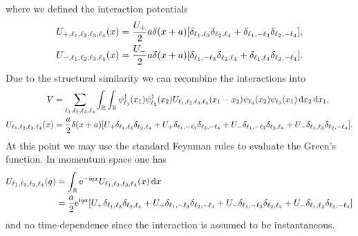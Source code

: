 \documentclass[english, parskip=full]{scrartcl}
\begin{document}
where we defined the interaction potentials
\begin{align}
U_{+,\ell_1,\ell_2,\ell_3,\ell_4}(x) &= \frac{U_+}{2} a\delta(x+a) \klb*{\delta_{\ell_1,\ell_3} \delta_{\ell_2,\ell_4} + \delta_{\ell_1,-\ell_3} \delta_{\ell_2,-\ell_4}},\\
U_{-,\ell_1,\ell_2,\ell_3,\ell_4}(x) &= \frac{U_-}{2} a\delta(x+a) \klb*{\delta_{\ell_1,-\ell_3} \delta_{\ell_2,\ell_4} + \delta_{\ell_1,\ell_3} \delta_{\ell_2,-\ell_4}}.
\end{align}
Due to the structural similarity we can recombine the interactions into 
\begin{align}
V &= \sum_{\ell_1,\ell_2,\ell_3,\ell_4} \intr{\intr{\psi_{\ell_1}^\dagger(x_1) \psi_{\ell_2}^\dagger(x_2) U_{\ell_1,\ell_2,\ell_3,\ell_4}(x_1-x_2) \psi_{\ell_4}(x_2) \psi_{\ell_3}(x_1)}{x_2}}{x_1},\\
U_{\ell_1,\ell_2,\ell_3,\ell_4}(x) &= \frac{a}{2} \delta(x+a) \klb*{U_+\delta_{\ell_1,\ell_3} \delta_{\ell_2,\ell_4} + U_+\delta_{\ell_1,-\ell_3} \delta_{\ell_2,-\ell_4} + U_-\delta_{\ell_1,-\ell_3} \delta_{\ell_2,\ell_4} + U_-\delta_{\ell_1,\ell_3} \delta_{\ell_2,-\ell_4}}.
\end{align}
At this point we may use the standard Feynman rules to evaluate the Green's function.
In momentum space one has
\begin{align}
U_{\ell_1,\ell_2,\ell_3,\ell_4}(q) &= \intr{\powe{-\i qx} U_{\ell_1,\ell_2,\ell_3,\ell_4}(x)}{x} \\
&= \frac{a}{2} \powe{\i qa} \klb*{U_+\delta_{\ell_1,\ell_3} \delta_{\ell_2,\ell_4} + U_+\delta_{\ell_1,-\ell_3} \delta_{\ell_2,-\ell_4} + U_-\delta_{\ell_1,-\ell_3} \delta_{\ell_2,\ell_4} + U_-\delta_{\ell_1,\ell_3} \delta_{\ell_2,-\ell_4}}
\end{align}
and no time-dependence since the interaction is assumed to be instantaneous.
\end{document}
